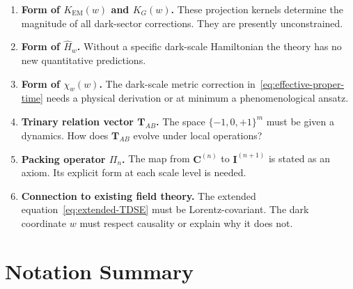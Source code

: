 \documentclass[11pt, a4paper, oneside]{article}
\theoremstyle{definition}
\theoremstyle{plain}
\theoremstyle{remark}
\begin{document}
\begin{enumerate}
  \item \textbf{Form of $K_\text{EM}(w)$ and $K_G(w)$.}
	These projection kernels determine the magnitude of all dark-sector
	corrections. They are presently unconstrained.

  \item \textbf{Form of $\hat{H}_w$.}
	Without a specific dark-scale Hamiltonian the theory has no
	new quantitative predictions.

  \item \textbf{Form of $\chi_w(w)$.}
	The dark-scale metric correction in~\eqref{eq:effective-proper-time}
	needs a physical derivation or at minimum a phenomenological ansatz.

  \item \textbf{Trinary relation vector $\mathbf{T}_{AB}$.}
	The space $\{-1, 0, +1\}^m$ must be given a dynamics. How does
	$\mathbf{T}_{AB}$ evolve under local operations?

  \item \textbf{Packing operator $\Pi_n$.}
	The map from $\mathbf{C}^{(n)}$ to $\mathbf{I}^{(n+1)}$ is stated
	as an axiom. Its explicit form at each scale level is needed.

  \item \textbf{Connection to existing field theory.}
	The extended equation~\eqref{eq:extended-TDSE} must be
	Lorentz-covariant. The dark coordinate $w$ must respect causality
	or explain why it does not.
\end{enumerate}

\appendix
\section{Notation Summary}
\end{document}
